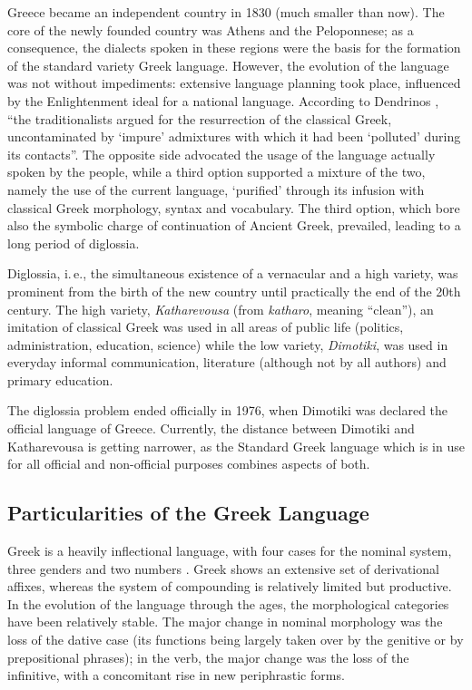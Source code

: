 \documentclass[]{../../metanetpaper}
\begin{document}
\begin{multicols}{2}

Greece became an independent country in 1830 (much smaller than now). The core of the newly founded country was Athens and the Peloponnese; as a consequence, the dialects spoken in these regions were the basis for the formation of the standard variety Greek language. However, the evolution of the language was not without impediments: extensive language planning took place, influenced by the Enlightenment ideal for a national language. According to Dendrinos \cite{Dend1}, “the traditionalists argued for the resurrection of the classical Greek, uncontaminated by ‘impure’ admixtures with which it had been ‘polluted’ during its contacts”. The opposite side advocated the usage of the language actually spoken by the people, while a third option supported a mixture of the two, namely the use of the current language, ‘purified’ through its infusion with classical Greek morphology, syntax  and vocabulary. The third option, which bore also the symbolic charge of continuation of Ancient Greek, prevailed, leading to a long period of diglossia.

Diglossia, i.\,e., the simultaneous existence of a vernacular and a high variety, was prominent from the birth of the new country until practically the end of the 20th century. The high variety, \textit{Katharevousa} (from \textit{katharo}, meaning “clean”), an imitation of classical Greek was used in all areas of public life (politics, administration, education, science) while the low variety, \textit{Dimotiki}, was used in everyday informal communication, literature (although not by all authors) and primary education.

The diglossia problem ended officially in 1976, when Dimotiki was declared the official language of Greece. Currently, the distance between Dimotiki and Katharevousa is getting narrower, as the Standard Greek language which is in use for all official and non-official purposes combines aspects of both.

\subsection{Particularities of the Greek Language}

Greek is a heavily inflectional language, with four cases for the nominal system, three genders and two numbers \cite{Mack1}. Greek shows an extensive set of derivational affixes, whereas the system of compounding is relatively limited but productive. In the evolution of the language through the ages, the morphological categories have been relatively stable. The major change in nominal morphology was the loss of the dative case (its functions being largely taken over by the genitive or by prepositional phrases); in the verb, the major change was the loss of the infinitive, with a concomitant rise in new periphrastic forms.


\end{multicols}
\end{document}
